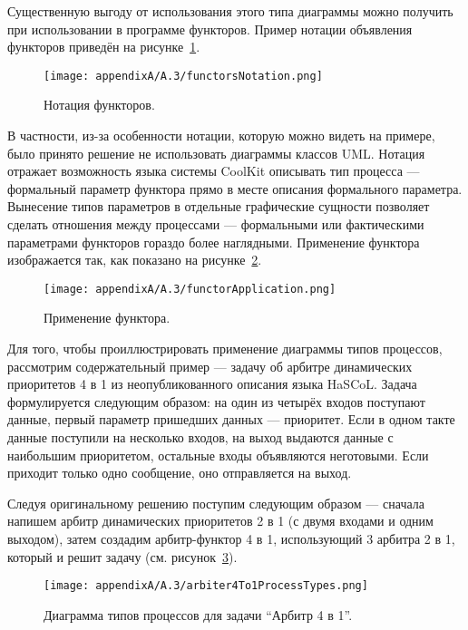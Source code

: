 Существенную выгоду от использования этого типа диаграммы можно получить при использовании 
в программе функторов. Пример нотации объявления функторов приведён на рисунке~\ref{image:functorsNotation}. 

\begin{figure} [ht]
	\begin{center}
		\texttt{[image: appendixA/A.3/functorsNotation.png]}
		\caption{Нотация функторов.}
		\label{image:functorsNotation}
	\end{center}
\end{figure}

В частности, из-за особенности нотации, которую можно видеть на примере, было принято 
решение не использовать диаграммы классов UML. Нотация отражает возможность языка 
системы CoolKit описывать тип процесса --- формальный параметр функтора прямо в месте 
описания формального параметра. Вынесение типов параметров в отдельные графические 
сущности позволяет сделать отношения между процессами --- формальными или фактическими 
параметрами функторов гораздо более наглядными. Применение функтора изображается так, 
как показано на рисунке~\ref{image:functorApplication}.

\begin{figure} [ht]
	\begin{center}
		\texttt{[image: appendixA/A.3/functorApplication.png]}
		\caption{Применение функтора.}
		\label{image:functorApplication}
	\end{center}
\end{figure}

Для того, чтобы проиллюстрировать применение диаграммы типов процессов, рассмотрим 
содержательный пример --- задачу об арбитре динамических приоритетов 4 в 1 из неопубликованного
описания языка HaSCoL. Задача формулируется следующим образом: на один из четырёх входов поступают данные, 
первый параметр пришедших данных --- приоритет. Если в одном такте данные поступили 
на несколько входов, на выход выдаются данные с наибольшим приоритетом, остальные 
входы объявляются неготовыми. Если приходит только одно сообщение, оно отправляется 
на выход.

Следуя оригинальному решению поступим следующим образом --- сначала напишем арбитр 
динамических приоритетов 2 в 1 (с двумя входами и одним выходом), затем создадим арбитр-функтор 
4 в 1, использующий 3 арбитра 2 в 1, который и решит задачу (см. рисунок~\ref{image:arbiter4To1ProcessTypes}). 

\begin{figure} [ht]
	\begin{center}
		\texttt{[image: appendixA/A.3/arbiter4To1ProcessTypes.png]}
		\caption{Диаграмма типов процессов для задачи "`Арбитр 4 в 1"'.}
		\label{image:arbiter4To1ProcessTypes}
	\end{center}
\end{figure}

